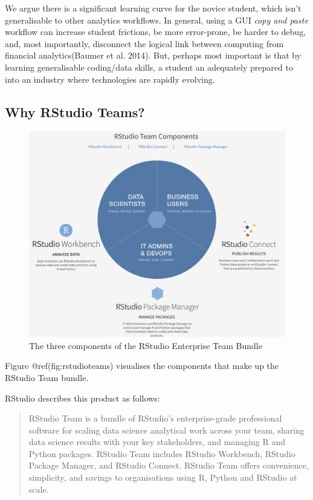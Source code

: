 \documentclass{article}
\begin{document}
We argue there is a significant learning curve for the novice student,
which isn't generalisable to other analytics workflows. In general,
using a GUI \emph{copy and paste} workflow can increase student
frictions, be more error-prone, be harder to debug, and, most
importantly, disconnect the logical link between computing from
financial analytics(Baumer et al. 2014). But, perhaps most important is
that by learning generalisable coding/data skills, a student an
adequately prepared to into an industry where technologies are rapidly
evolving.

\hypertarget{why-rstudio-teams}{%
\subsection{Why RStudio Teams?}\label{why-rstudio-teams}}

\begin{figure}

{\centering \includegraphics[width=0.7\linewidth]{img/Team} 

}

\caption{The three components of the RStudio Enterprise Team Bundle}\label{fig:rstudioteams}
\end{figure}

Figure @ref(fig:rstudioteams) visualises the components that make up the
RStudio Team bundle.

RStudio describes this product as follows:

\begin{quote}
RStudio Team is a bundle of RStudio's enterprise-grade professional
software for scaling data science analytical work across your team,
sharing data science results with your key stakeholders, and managing R
and Python packages. RStudio Team includes RStudio Workbench, RStudio
Package Manager, and RStudio Connect. RStudio Team offers convenience,
simplicity, and savings to organisations using R, Python and RStudio at
scale.
\end{quote}
\end{document}
